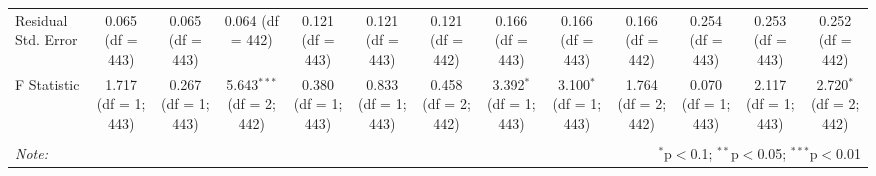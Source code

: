 \begin{table}[!htbp]
\begin{tabular}{@{\extracolsep{5pt}}lcccccccccccc}
Residual Std. Error & 0.065 (df = 443) & 0.065 (df = 443) & 0.064 (df = 442) & 0.121 (df = 443) & 0.121 (df = 443) & 0.121 (df = 442) & 0.166 (df = 443) & 0.166 (df = 443) & 0.166 (df = 442) & 0.254 (df = 443) & 0.253 (df = 443) & 0.252 (df = 442) \\ 
F Statistic & 1.717 (df = 1; 443) & 0.267 (df = 1; 443) & 5.643$^{***}$ (df = 2; 442) & 0.380 (df = 1; 443) & 0.833 (df = 1; 443) & 0.458 (df = 2; 442) & 3.392$^{*}$ (df = 1; 443) & 3.100$^{*}$ (df = 1; 443) & 1.764 (df = 2; 442) & 0.070 (df = 1; 443) & 2.117 (df = 1; 443) & 2.720$^{*}$ (df = 2; 442) \\ 
\hline 
\hline \\[-1.8ex] 
\textit{Note:}  & \multicolumn{12}{r}{$^{*}$p$<$0.1; $^{**}$p$<$0.05; $^{***}$p$<$0.01} \\ 
\end{tabular} 
\end{table} 
